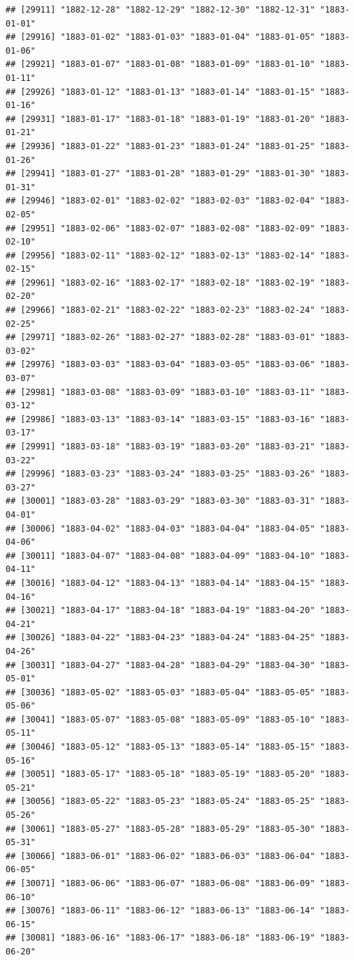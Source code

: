 \documentclass{article}\usepackage[]{graphicx}\usepackage[]{color}
\makeatletter
\newenvironment{kframe}{%
 \def\at@end@of@kframe{}%
 \ifinner\ifhmode%
  \def\at@end@of@kframe{\end{minipage}}%
  \begin{minipage}{\columnwidth}%
 \fi\fi%
 \def\FrameCommand##1{\hskip\@totalleftmargin \hskip-\fboxsep
 \colorbox{shadecolor}{##1}\hskip-\fboxsep
     \hskip-\linewidth \hskip-\@totalleftmargin \hskip\columnwidth}%
 \MakeFramed {\advance\hsize-\width
   \@totalleftmargin\z@ \linewidth\hsize
   \@setminipage}}%
 {\par\unskip\endMakeFramed%
 \at@end@of@kframe}
\newenvironment{knitrout}{}{} %
\makeatother
\begin{document}
\begin{description}
\begin{knitrout}
\begin{kframe}
\begin{verbatim}
## [29911] "1882-12-28" "1882-12-29" "1882-12-30" "1882-12-31" "1883-01-01"
## [29916] "1883-01-02" "1883-01-03" "1883-01-04" "1883-01-05" "1883-01-06"
## [29921] "1883-01-07" "1883-01-08" "1883-01-09" "1883-01-10" "1883-01-11"
## [29926] "1883-01-12" "1883-01-13" "1883-01-14" "1883-01-15" "1883-01-16"
## [29931] "1883-01-17" "1883-01-18" "1883-01-19" "1883-01-20" "1883-01-21"
## [29936] "1883-01-22" "1883-01-23" "1883-01-24" "1883-01-25" "1883-01-26"
## [29941] "1883-01-27" "1883-01-28" "1883-01-29" "1883-01-30" "1883-01-31"
## [29946] "1883-02-01" "1883-02-02" "1883-02-03" "1883-02-04" "1883-02-05"
## [29951] "1883-02-06" "1883-02-07" "1883-02-08" "1883-02-09" "1883-02-10"
## [29956] "1883-02-11" "1883-02-12" "1883-02-13" "1883-02-14" "1883-02-15"
## [29961] "1883-02-16" "1883-02-17" "1883-02-18" "1883-02-19" "1883-02-20"
## [29966] "1883-02-21" "1883-02-22" "1883-02-23" "1883-02-24" "1883-02-25"
## [29971] "1883-02-26" "1883-02-27" "1883-02-28" "1883-03-01" "1883-03-02"
## [29976] "1883-03-03" "1883-03-04" "1883-03-05" "1883-03-06" "1883-03-07"
## [29981] "1883-03-08" "1883-03-09" "1883-03-10" "1883-03-11" "1883-03-12"
## [29986] "1883-03-13" "1883-03-14" "1883-03-15" "1883-03-16" "1883-03-17"
## [29991] "1883-03-18" "1883-03-19" "1883-03-20" "1883-03-21" "1883-03-22"
## [29996] "1883-03-23" "1883-03-24" "1883-03-25" "1883-03-26" "1883-03-27"
## [30001] "1883-03-28" "1883-03-29" "1883-03-30" "1883-03-31" "1883-04-01"
## [30006] "1883-04-02" "1883-04-03" "1883-04-04" "1883-04-05" "1883-04-06"
## [30011] "1883-04-07" "1883-04-08" "1883-04-09" "1883-04-10" "1883-04-11"
## [30016] "1883-04-12" "1883-04-13" "1883-04-14" "1883-04-15" "1883-04-16"
## [30021] "1883-04-17" "1883-04-18" "1883-04-19" "1883-04-20" "1883-04-21"
## [30026] "1883-04-22" "1883-04-23" "1883-04-24" "1883-04-25" "1883-04-26"
## [30031] "1883-04-27" "1883-04-28" "1883-04-29" "1883-04-30" "1883-05-01"
## [30036] "1883-05-02" "1883-05-03" "1883-05-04" "1883-05-05" "1883-05-06"
## [30041] "1883-05-07" "1883-05-08" "1883-05-09" "1883-05-10" "1883-05-11"
## [30046] "1883-05-12" "1883-05-13" "1883-05-14" "1883-05-15" "1883-05-16"
## [30051] "1883-05-17" "1883-05-18" "1883-05-19" "1883-05-20" "1883-05-21"
## [30056] "1883-05-22" "1883-05-23" "1883-05-24" "1883-05-25" "1883-05-26"
## [30061] "1883-05-27" "1883-05-28" "1883-05-29" "1883-05-30" "1883-05-31"
## [30066] "1883-06-01" "1883-06-02" "1883-06-03" "1883-06-04" "1883-06-05"
## [30071] "1883-06-06" "1883-06-07" "1883-06-08" "1883-06-09" "1883-06-10"
## [30076] "1883-06-11" "1883-06-12" "1883-06-13" "1883-06-14" "1883-06-15"
## [30081] "1883-06-16" "1883-06-17" "1883-06-18" "1883-06-19" "1883-06-20"

\end{verbatim}
\end{kframe}
\end{knitrout}
\end{description}
\end{document}
